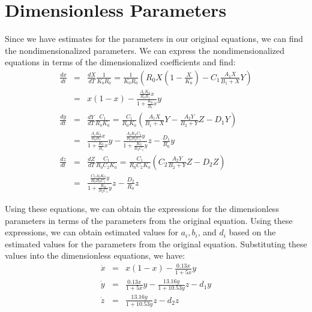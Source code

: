 \documentclass{article}
\begin{document}
\section{Dimensionless Parameters}

Since we have estimates for the parameters in our original equations, we can find the nondimensionalized parameters. We can express the nondimensionalized equations in terms of the dimensionalized coefficients and find:
\begin{eqnarray}
\frac{dx}{dt} &=& \frac{dX}{dT} \frac{1}{K_0 R_0} = \frac{1}{K_0 R_0} \left( R_0 X \left(1 - \frac{X}{K_0} \right) - C_1 \frac{A_1 X}{B_1 + X} Y \right) \nonumber \\
&=& x(1-x) - \frac{\frac{A_1 K_0}{R_0 B_1} x}{1 + \frac{K_0}{B_1} x} y \\
\frac{dy}{dt} &=& \frac{dY}{dT} \frac{C_1}{R_0 K_0} = \frac{C_1}{R_0 K_0} \left( \frac{A_1 X}{B_1 + X} Y - \frac{A_2 Y}{B_2 + Y} Z - D_1 Y \right) \nonumber \\
&=& \frac{ \frac{A_1 K_0}{R_0 B_1} x}{1 + \frac{K_0}{B_1} x} y - \frac{\frac{A_2 K_0 C_2}{R_0 B_2 C_1}y}{1 + \frac{K_0}{B_2 C_1} y } z - \frac{D_1}{R_0} y \\
\frac{dz}{dt} &=& \frac{dZ}{dT} \frac{C_1}{R_0 C_2 K_0} = \frac{C_1}{R_0 C_2 K_0} \left( C_2 \frac{A_2 Y}{B_2 + Y} Z - D_2 Z \right) \nonumber \\
&=& \frac{ \frac{C_2 A_2 K_0}{R_0 B_2 C_1} y}{1 + \frac{ K_0}{B_2 C_1} y} z - \frac{D_2}{R_0} z  
\end{eqnarray}

Using these equations, we can obtain the expressions for the dimensionless parameters in terms of the parameters from the original equation. Using these expressions, we can obtain estimated values for $a_i, b_i$, and $d_i$ based on the estimated values for the parameters from the original equation. Substituting these values into the dimensionless equations, we have:
\begin{eqnarray}
\dot{x} &=& x(1-x) - \frac{0.13 x }{1 + 5 x}y \\
\dot{y} &=& \frac{0.13 x}{1 + 5 x} y - \frac{13.16 y}{1 + 10.53 y} z - d_1 y \\
\dot{z} &=& \frac{13.16 y}{1 + 10.53 y} z - d_2 z
\end{eqnarray}
\end{document}
